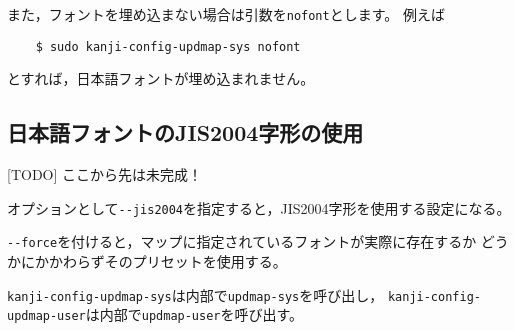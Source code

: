 \documentclass{jlreq}
\def\command#1{\texttt{#1}}
\def\option#1{\texttt{-{}-#1}}
\begin{document}
また，フォントを埋め込まない場合は引数を\command{nofont}とします。
例えば
\begin{verbatim}
    $ sudo kanji-config-updmap-sys nofont
\end{verbatim}
とすれば，日本語フォントが埋め込まれません。

\subsection{日本語フォントのJIS2004字形の使用}




[TODO] ここから先は未完成！

オプションとして\option{jis2004}を指定すると，JIS2004字形を使用する設定になる。

\option{force}を付けると，マップに指定されているフォントが実際に存在するか
どうかにかかわらずそのプリセットを使用する。

\command{kanji-config-updmap-sys}は内部で\command{updmap-sys}を呼び出し，
\command{kanji-config-updmap-user}は内部で\command{updmap-user}を呼び出す。
\end{document}
